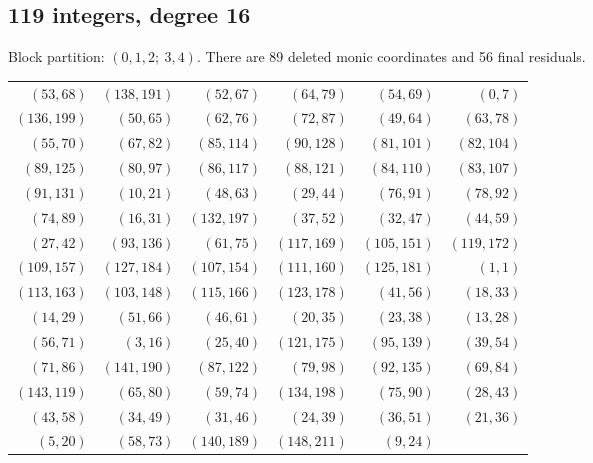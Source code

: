 \subsection{119 integers, degree 16}
Block partition: $(0,1,2;\ 3,4)$.
There are 89 deleted monic coordinates and 56 final residuals.
\begin{center}\small\begin{tabular}{rrrrrr}\toprule
$(53,68)$ & $(138,191)$ & $(52,67)$ & $(64,79)$ & $(54,69)$ & $(0,7)$\\
$(136,199)$ & $(50,65)$ & $(62,76)$ & $(72,87)$ & $(49,64)$ & $(63,78)$\\
$(55,70)$ & $(67,82)$ & $(85,114)$ & $(90,128)$ & $(81,101)$ & $(82,104)$\\
$(89,125)$ & $(80,97)$ & $(86,117)$ & $(88,121)$ & $(84,110)$ & $(83,107)$\\
$(91,131)$ & $(10,21)$ & $(48,63)$ & $(29,44)$ & $(76,91)$ & $(78,92)$\\
$(74,89)$ & $(16,31)$ & $(132,197)$ & $(37,52)$ & $(32,47)$ & $(44,59)$\\
$(27,42)$ & $(93,136)$ & $(61,75)$ & $(117,169)$ & $(105,151)$ & $(119,172)$\\
$(109,157)$ & $(127,184)$ & $(107,154)$ & $(111,160)$ & $(125,181)$ & $(1,1)$\\
$(113,163)$ & $(103,148)$ & $(115,166)$ & $(123,178)$ & $(41,56)$ & $(18,33)$\\
$(14,29)$ & $(51,66)$ & $(46,61)$ & $(20,35)$ & $(23,38)$ & $(13,28)$\\
$(56,71)$ & $(3,16)$ & $(25,40)$ & $(121,175)$ & $(95,139)$ & $(39,54)$\\
$(71,86)$ & $(141,190)$ & $(87,122)$ & $(79,98)$ & $(92,135)$ & $(69,84)$\\
$(143,119)$ & $(65,80)$ & $(59,74)$ & $(134,198)$ & $(75,90)$ & $(28,43)$\\
$(43,58)$ & $(34,49)$ & $(31,46)$ & $(24,39)$ & $(36,51)$ & $(21,36)$\\
$(5,20)$ & $(58,73)$ & $(140,189)$ & $(148,211)$ & $(9,24)$ & \\
\bottomrule\end{tabular}\end{center}

